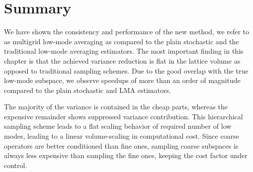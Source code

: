 


\section{Summary}
\label{sec:numerics:summary}

We have shown the consistency and performance of the new method, we refer to as multigrid low-mode averaging as compared to the plain stochastic and the traditional low-mode averaging estimators.
The most important finding in this chapter is that the achieved variance reduction is flat in the lattice volume as opposed to traditional sampling schemes.
Due to the good overlap with the true low-mode subspace, we observe speedups of more than an order of magnitude compared to the plain stochastic and LMA estimators.

The majority of the variance is contained in the cheap parts, whereas the expensive remainder shows suppressed variance contribution.
This hierarchical sampling scheme leads to a flat scaling behavior of required number of low modes, leading to a linear volume-scaling in computational cost.
Since coarse operators are better conditioned than fine ones, sampling coarse subspaces is always less expensive than sampling the fine ones, keeping the cost factor under control.

